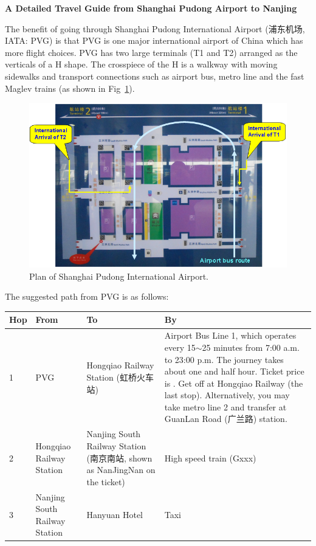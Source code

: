 \documentclass[11pt]{article}
\begin{document}
\setcounter{tocdepth}{1}

\newcommand{\alert}[1]{{\color{red}{#1}}}

\begin{center}
{\Large\bf A Detailed Travel Guide from Shanghai Pudong Airport to Nanjing}
\end{center}

The benefit of going through Shanghai Pudong International Airport (浦东机场, IATA: PVG) 
is that PVG is one major international airport of China which has more flight choices. 
PVG has two large terminals (T1 and T2) arranged as the verticals of a H shape. 
The crosspiece of the H is a walkway with moving sidewalks and transport connections 
such as airport bus, metro line and the fast Maglev trains (as shown in Fig~\ref{pvg}).

\begin{figure}[h]
	\begin{center}
		\includegraphics[scale=0.6]{pvg2.jpg}
	\end{center}
 	 \caption{Plan of Shanghai Pudong International Airport.\label{pvg}}
 \end{figure}
 
 The suggested path from PVG is as follows:
 
 \begin{center}
 \begin{tabular}{| l | p{1.5cm} | p{4cm} | p{6cm}|}
  	\hline
	\textbf{Hop} 	&	\bf{From}		& \bf{To	}								& \bf{By} \\
	\hline
	1					&	PVG				& Hongqiao Railway Station (虹桥火车站)	& Airport Bus Line 1, %
	which operates every 15$\sim$25 minutes from 7:00 a.m. to 23:00 p.m. The journey takes about %
	one and half hour. Ticket price is \textyen20. Get off   at Hongqiao Railway (the last stop). %
	Alternatively, you may take metro line 2 and  transfer at GuanLan Road (广兰路) station. \\
	\hline
	2					&	Hongqiao Railway Station 	& Nanjing South Railway Station (南京南站, shown as NanJingNan on the ticket) & High speed train (Gxxx)	\\
	\hline
	3					& Nanjing South Railway Station & Hanyuan Hotel	& Taxi \\			
	\hline
\end{tabular}
\end{center}
\end{document}
